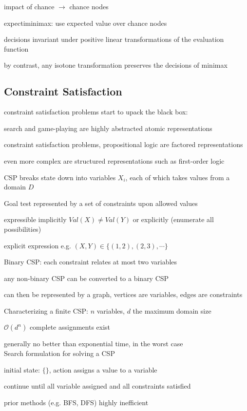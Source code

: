 \documentclass[12pt]{article}
\begin{document}
\noindent
impact of chance $\to$ chance nodes

expectiminimax: use expected value over chance nodes

decisions invariant under positive linear transformations of the evaluation function

by contrast, any isotone transformation preserves the decisions of minimax

\subsection{Constraint Satisfaction}

\noindent
constraint satisfaction problems start to upack the black box:

search and game-playing are highly abstracted atomic representations

constraint satisfaction problems, propositional logic are factored representations

even more complex are structured representations such as first-order logic

\noindent
CSP breaks state down into variables $X_i$, each of which takes values from a domain $D$

Goal test represented by a set of constraints upon allowed values

expressible implicitly $Val(X) \neq Val(Y)$ or explicitly (enumerate all possibilities)

explicit expression e.g. $(X, Y) \in \{(1, 2), (2, 3), \cdots \}$

\noindent
Binary CSP: each constraint relates at most two variables

any non-binary CSP can be converted to a binary CSP

can then be represented by a graph, vertices are variables, edges are constraints

\noindent
Characterizing a finite CSP: $n$ variables, $d$ the maximum domain size

$\mathcal{O}(d^n)$ complete assignments exist

generally no better than exponential time, in the worst case\\

\noindent
Search formulation for solving a CSP

initial state: $\{\}$, action assigns a value to a variable

continue until all variable assigned and all constraints satisfied

prior methods (e.g. BFS, DFS) highly inefficient
\end{document}

